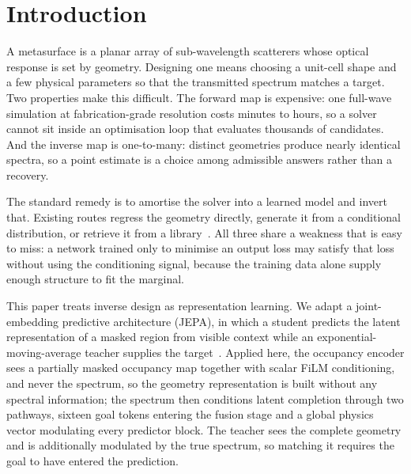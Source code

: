 \documentclass[pdflatex,oneside,sn-mathphys-num]{sn-jnl}
\theoremstyle{thmstyleone}
\theoremstyle{thmstyletwo}
\theoremstyle{thmstylethree}
\begin{document}
\maketitle

\section{Introduction}\label{sec1}

A metasurface is a planar array of sub-wavelength scatterers whose optical response is
set by geometry. Designing one means choosing a unit-cell shape and a few physical
parameters so that the transmitted spectrum matches a target. Two properties make this
difficult. The forward map is expensive: one full-wave simulation at fabrication-grade
resolution costs minutes to hours, so a solver cannot sit inside an optimisation loop
that evaluates thousands of candidates. And the inverse map is one-to-many: distinct
geometries produce nearly identical spectra, so a point estimate is a choice among
admissible answers rather than a recovery.

The standard remedy is to amortise the solver into a learned model and invert that.
Existing routes regress the geometry directly, generate it from a conditional
distribution, or retrieve it from a library~\cite{empowering,roadmap,revisit}. All three
share a weakness that is easy to miss: a network trained only to minimise an output
loss may satisfy that loss without using the conditioning signal, because the training
data alone supply enough structure to fit the marginal.

This paper treats inverse design as representation learning. We adapt a
joint-embedding predictive architecture (JEPA), in which a student predicts the latent
representation of a masked region from visible context while an
exponential-moving-average teacher supplies the target~\cite{ijepa}. Applied here, the
occupancy encoder sees a partially masked occupancy map together with scalar FiLM
conditioning, and never the spectrum, so the geometry representation is built without any
spectral information; the spectrum then conditions
latent completion through two pathways, sixteen goal tokens entering the fusion stage
and a global physics vector modulating every predictor block. The teacher sees the
complete geometry and is additionally modulated by the true spectrum, so matching it
requires the goal to have entered the prediction.
\end{document}
